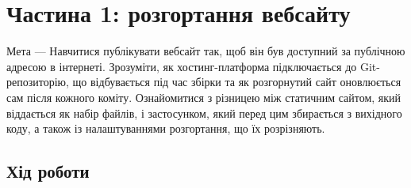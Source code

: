 \documentclass[12pt, a4paper]{article}
\begin{document}

\section{Частина 1: розгортання вебсайту}
Мета --- Навчитися публікувати вебсайт так, щоб він був доступний за публічною адресою в інтернеті. Зрозуміти, як хостинг-платформа підключається до Git-репозиторію, що відбувається під час збірки та як розгорнутий сайт оновлюється сам після кожного коміту. Ознайомитися з різницею між статичним сайтом, який віддається як набір файлів, і застосунком, який перед цим збирається з вихідного коду, а також із налаштуваннями розгортання, що їх розрізняють.
\subsection{Хід роботи}
\end{document}

